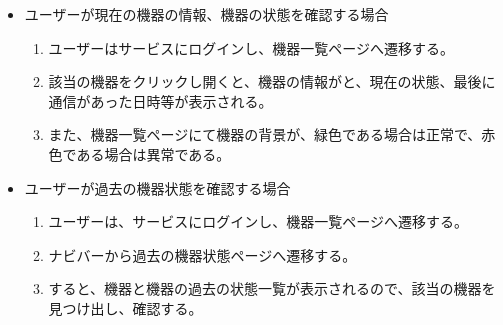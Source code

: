 \begin{itemize}
\begin{enumerate}
	\end{enumerate}
\item ユーザーが現在の機器の情報、機器の状態を確認する場合
	\begin{enumerate}
	\item ユーザーはサービスにログインし、機器一覧ページへ遷移する。
	\item 該当の機器をクリックし開くと、機器の情報がと、現在の状態、最後に通信があった日時等が表示される。
	\item また、機器一覧ページにて機器の背景が、緑色である場合は正常で、赤色である場合は異常である。
	\end{enumerate}
\item ユーザーが過去の機器状態を確認する場合
	\begin{enumerate}
	\item ユーザーは、サービスにログインし、機器一覧ページへ遷移する。
	\item ナビバーから過去の機器状態ページへ遷移する。
	\item すると、機器と機器の過去の状態一覧が表示されるので、該当の機器を見つけ出し、確認する。
	\end{enumerate}
\end{itemize}

